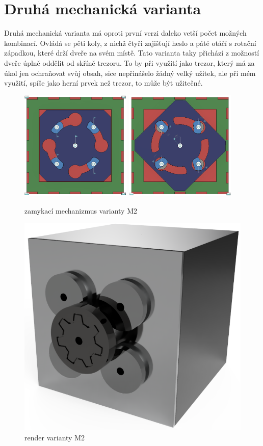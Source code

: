 \section{Druhá mechanická varianta}


Druhá mechanická varianta má oproti první verzi daleko vetší počet možných kombinací.
Ovládá se pěti koly, z nichž čtyři zajišťují heslo a páté otáčí s rotační západkou, které drží dveře na svém místě.
Tato varianta taky přichází z možností dveře úplně oddělit od skříně trezoru. To by při využití jako trezor, který
má za úkol jen ochraňovat svůj obsah, sice nepřinášelo žádný velký užitek, ale při mém využití, spíše jako herní 
prvek než trezor, to může být užitečné.

\begin{figure}[htbp]
    \centering
    \includegraphics[width=150pt]{kapitoly/obrazky/M2/mechanizmus_odemcen.png}
    \includegraphics[width=150pt]{kapitoly/obrazky/M2/mechanizmus_zamceno.png}
    \caption{zamykací mechanizmus varianty M2}
    \label{fig:M2-mechanizmus}
\end{figure}

\begin{figure}[htbp]
    \centering
    \includegraphics[width=\textwidth]{kapitoly/obrazky/M2/predni_render.PNG}
    \caption{render varianty M2}
    \label{fig:M1.0}
\end{figure}


\newpage